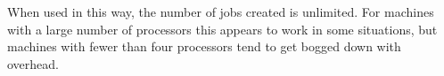 \begin{itemize}

When used in this way, the number of jobs created is unlimited.  For machines
with a large number of processors this appears to work in some situations, but
machines with fewer than four processors tend to get bogged down with
overhead.

\end{itemize}

